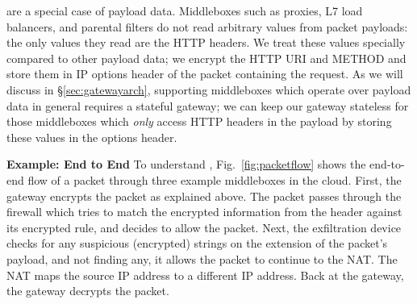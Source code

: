  are a special case of payload data.
Middleboxes such as proxies, L7 load balancers, and parental filters do not read arbitrary values from packet payloads: the only values they read are the HTTP headers.
We treat these values specially compared to other payload data; we encrypt the HTTP URI and METHOD and store them in IP options header of the packet containing the request.
As we will discuss in \S\ref{sec:gatewayarch}, supporting middleboxes which operate over payload data in general requires a stateful gateway; we can keep our gateway stateless for those middleboxes which {\it only} access HTTP headers in the payload by storing these values in the options header. 


\noindent\textbf{Example: End to End}
To understand \sys, Fig.~\ref{fig:packetflow} shows the end-to-end flow of a packet through three example middleboxes in the cloud.  First,  the gateway encrypts the packet as explained above. The packet passes through the firewall which tries to match the encrypted information from the header against its encrypted rule, and decides to allow the packet. Next, the exfiltration device checks for any suspicious (encrypted) strings on the extension of the packet's payload, and not finding any, it allows the packet  to continue to the NAT. The NAT maps the source IP address to a different IP address. Back at the gateway, the gateway decrypts the packet. 



